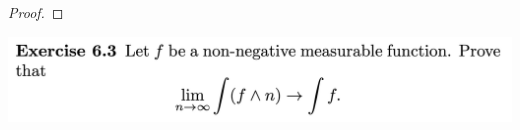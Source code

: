 \begin{proof}



\end{proof}

\newpage
\begin{mdframed}
\includegraphics[width=400pt]{img/analysis--berkeley-202a-hw07-5290.png}
\end{mdframed}


